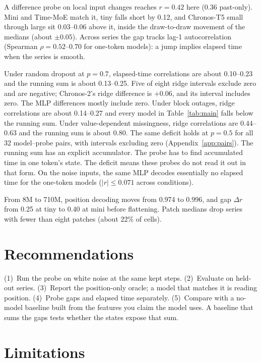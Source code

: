 \documentclass{article}
\begin{document}
A difference probe on local input changes reaches $r = 0.42$ here (0.36 past-only).
Mini and Time-MoE match it, tiny falls short by 0.12, and Chronos-T5 small through large sit 0.03--0.06 above it, inside the draw-to-draw movement of the medians (about $\pm 0.05$).
Across series the gap tracks lag-1 autocorrelation (Spearman $\rho = 0.52$--$0.70$ for one-token models): a jump implies elapsed time when the series is smooth.

Under random dropout at $p = 0.7$, elapsed-time correlations are about 0.10--0.23 and the running sum is about 0.13--0.25.
Five of eight ridge intervals exclude zero and are negative; Chronos-2's ridge difference is $+0.06$, and its interval includes zero.
The MLP differences mostly include zero.
Under block outages, ridge correlations are about 0.14--0.27 and every model in Table~\ref{tab:main} falls below the running sum.
Under value-dependent missingness, ridge correlations are $0.44$--$0.63$ and the running sum is about 0.80.
The same deficit holds at $p = 0.5$ for all 32 model--probe pairs, with intervals excluding zero (Appendix~\ref{app:pairs}).
The running sum has an explicit accumulator.
The probe has to find accumulated time in one token's state.
The deficit means these probes do not read it out in that form.
On the noise inputs, the same MLP decodes essentially no elapsed time for the one-token models ($|r| \le 0.071$ across conditions).

From 8M to 710M, position decoding moves from 0.974 to 0.996, and gap $\Delta r$ from 0.25 at tiny to 0.40 at mini before flattening.
Patch medians drop series with fewer than eight patches (about 22\% of cells).

\section{Recommendations}
\label{sec:recs}

(1)~Run the probe on white noise at the same kept steps.
(2)~Evaluate on held-out series.
(3)~Report the position-only oracle; a model that matches it is reading position.
(4)~Probe gaps and elapsed time separately.
(5)~Compare with a no-model baseline built from the features you claim the model uses.
A baseline that sums the gaps tests whether the states expose that sum.

\section{Limitations}
\label{sec:limits}
\end{document}
